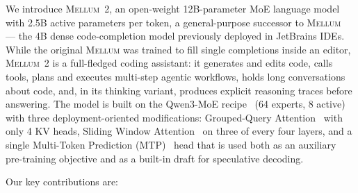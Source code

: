 \documentclass{llmxive}
\providecommand{\modelname}{\textsc{Mellum~2}\xspace}
\providecommand{\prevmodelname}{\textsc{Mellum}\xspace}
\begin{document}
We introduce \modelname, an open-weight 12B-parameter MoE language model
with 2.5B active parameters per token, a general-purpose successor to
\prevmodelname~\cite{mellum2025} --- the 4B dense code-completion model previously
deployed in JetBrains IDEs. While the original \prevmodelname was trained to fill
single completions inside an editor, \modelname is a full-fledged coding
assistant: it generates and edits code, calls tools, plans and executes
multi-step agentic workflows, holds long conversations about code, and, in
its thinking variant, produces explicit reasoning traces before answering.
The model is built on the Qwen3-MoE recipe~\cite{yang2025qwen3} (64 experts,
8 active) with three deployment-oriented modifications: Grouped-Query
Attention~\cite{ainslie2023gqa} with only 4 KV heads, Sliding Window
Attention~\cite{beltagy2020longformer} on three of every four layers, and a
single Multi-Token Prediction (MTP)~\cite{gloeckle2024mtp} head that is used both as an auxiliary pre-training objective and as a built-in draft for speculative decoding.

Our key contributions are:
\end{document}
